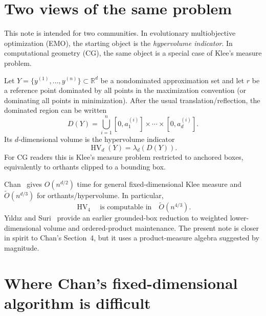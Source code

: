 \documentclass[12pt,a4paper]{article}
\theoremstyle{definition}
\newcommand{\HV}{\operatorname{HV}}
\newcommand{\1}{\mathbf 1}
\newcommand{\R}{\mathbb R}
\newcommand{\wtO}{\widetilde O}
\begin{document}
\begin{abstract}
Compression has now been checked exactly in $d=4$ and $d=6$ under both Lebesgue and magnitude product measures, and two nested compression generations have been checked in dimensions $2,3,4,6$. The elimination calculus is exact against product-grid oracles through $p=12$ variables; $d=8$ compression would require $p=16$ and remains untested. With Chan's cutting and fixed-block schedule unchanged, the mathematical raw-emission closure retains the $\widetilde O_d(n^{d/3})$ asymptotic bound. The contribution is a product-measure reformulation and a verified simplification calculus, not a better exponent.
\end{abstract}

\section{Two views of the same problem}

This note is intended for two communities. In evolutionary multiobjective optimization (EMO), the starting object is the \emph{hypervolume indicator}. In computational geometry (CG), the same object is a special case of Klee's measure problem.

Let $Y=\{y^{(1)},\dots,y^{(n)}\}\subset\R^d$ be a nondominated approximation set and let $r$ be a reference point dominated by all points in the maximization convention (or dominating all points in minimization). After the usual translation/reflection, the dominated region can be written
\[
D(Y)=\bigcup_{i=1}^n [0,a^{(i)}_1]\times\cdots\times[0,a^{(i)}_d].
\]
Its $d$-dimensional volume is the hypervolume indicator
\[
\HV_d(Y)=\lambda_d(D(Y)).
\]
For CG readers this is Klee's measure problem restricted to anchored boxes, equivalently to orthants clipped to a bounding box.

Chan~\cite{Chan2013} gives $O(n^{d/2})$ time for general fixed-dimensional Klee measure and $\wtO(n^{d/3})$ for orthants/hypervolume. In particular,
\[
\HV_4\quad\text{is computable in}\quad \wtO(n^{4/3}).
\]
Y\i ld\i z and Suri~\cite{YildizSuri2012} provide an earlier grounded-box reduction to weighted lower-dimensional volume and ordered-product maintenance. The present note is closer in spirit to Chan's Section~4, but it uses a product-measure algebra suggested by magnitude.

\section{Where Chan's fixed-dimensional algorithm is difficult}
\end{document}
